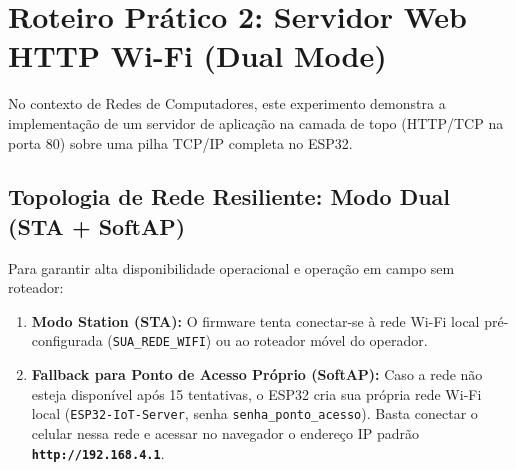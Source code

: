 \documentclass[a4paper,11pt]{article}
\begin{document}
\section{Roteiro Prático 2: Servidor Web HTTP Wi-Fi (Dual Mode)}

No contexto de Redes de Computadores, este experimento demonstra a implementação de um servidor de aplicação na camada de topo (HTTP/TCP na porta 80) sobre uma pilha TCP/IP completa no ESP32.

\subsection{Topologia de Rede Resiliente: Modo Dual (STA + SoftAP)}
Para garantir alta disponibilidade operacional e operação em campo sem roteador:
\begin{enumerate}
    \item \textbf{Modo Station (STA):} O firmware tenta conectar-se à rede Wi-Fi local pré-configurada (\texttt{SUA\_REDE\_WIFI}) ou ao roteador móvel do operador.
    \item \textbf{Fallback para Ponto de Acesso Próprio (SoftAP):} Caso a rede não esteja disponível após 15 tentativas, o ESP32 cria sua própria rede Wi-Fi local (\texttt{ESP32-IoT-Server}, senha \texttt{senha\_ponto\_acesso}). Basta conectar o celular nessa rede e acessar no navegador o endereço IP padrão \textbf{\texttt{http://192.168.4.1}}.
\end{enumerate}
\end{document}
